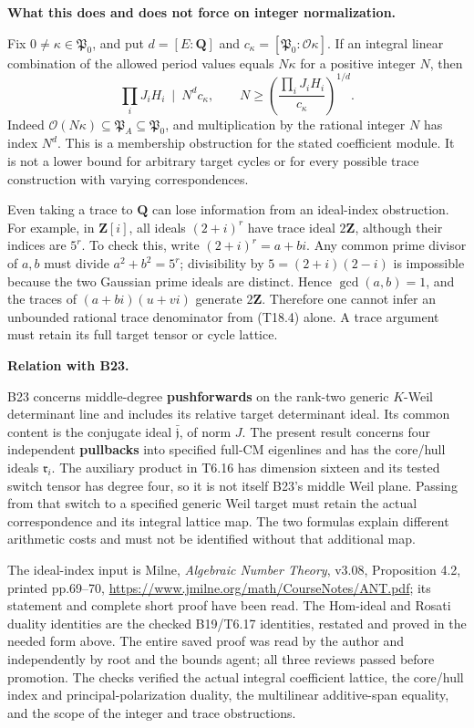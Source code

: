 \documentclass[11pt,a4paper]{article}
\theoremstyle{definition}
\begin{document}
\textbf{What this does and does not force on integer normalization.}

Fix \(0\ne\kappa\in\mathfrak P_0\), and put \(d=[E:\mathbf Q]\) and \(c_\kappa=[\mathfrak P_0:\mathcal O\kappa]\). If an integral linear combination of the allowed period values equals \(N\kappa\) for a positive integer \(N\), then \[
\prod_iJ_iH_i\ \mid\ N^d c_\kappa,
\qquad
N\ge\left(\frac{\prod_iJ_iH_i}{c_\kappa}\right)^{1/d}.
\tag{T18.8}
\] Indeed \(\mathcal O(N\kappa)\subseteq\mathfrak P_A\subseteq\mathfrak P_0\), and multiplication by the rational integer \(N\) has index \(N^d\). This is a membership obstruction for the stated coefficient module. It is not a lower bound for arbitrary target cycles or for every possible trace construction with varying correspondences.

Even taking a trace to \(\mathbf Q\) can lose information from an ideal-index obstruction. For example, in \(\mathbf Z[i]\), all ideals \((2+i)^r\) have trace ideal \(2\mathbf Z\), although their indices are \(5^r\). To check this, write \((2+i)^r=a+bi\). Any common prime divisor of \(a,b\) must divide \(a^2+b^2=5^r\); divisibility by \(5=(2+i)(2-i)\) is impossible because the two Gaussian prime ideals are distinct. Hence \(\gcd(a,b)=1\), and the traces of \((a+bi)(u+vi)\) generate \(2\mathbf Z\). Therefore one cannot infer an unbounded rational trace denominator from (T18.4) alone. A trace argument must retain its full target tensor or cycle lattice.

\textbf{Relation with B23.}

B23 concerns middle-degree \textbf{pushforwards} on the rank-two generic \(K\)-Weil determinant line and includes its relative target determinant ideal. Its common content is the conjugate ideal \(\bar{\mathfrak j}\), of norm \(J\). The present result concerns four independent \textbf{pullbacks} into specified full-CM eigenlines and has the core/hull ideals \(\mathfrak r_i\). The auxiliary product in T6.16 has dimension sixteen and its tested switch tensor has degree four, so it is not itself B23's middle Weil plane. Passing from that switch to a specified generic Weil target must retain the actual correspondence and its integral lattice map. The two formulas explain different arithmetic costs and must not be identified without that additional map.

The ideal-index input is Milne, \emph{Algebraic Number Theory}, v3.08, Proposition 4.2, printed pp.69--70, \url{https://www.jmilne.org/math/CourseNotes/ANT.pdf}; its statement and complete short proof have been read. The Hom-ideal and Rosati duality identities are the checked B19/T6.17 identities, restated and proved in the needed form above. The entire saved proof was read by the author and independently by root and the bounds agent; all three reviews passed before promotion. The checks verified the actual integral coefficient lattice, the core/hull index and principal-polarization duality, the multilinear additive-span equality, and the scope of the integer and trace obstructions.
\end{document}
